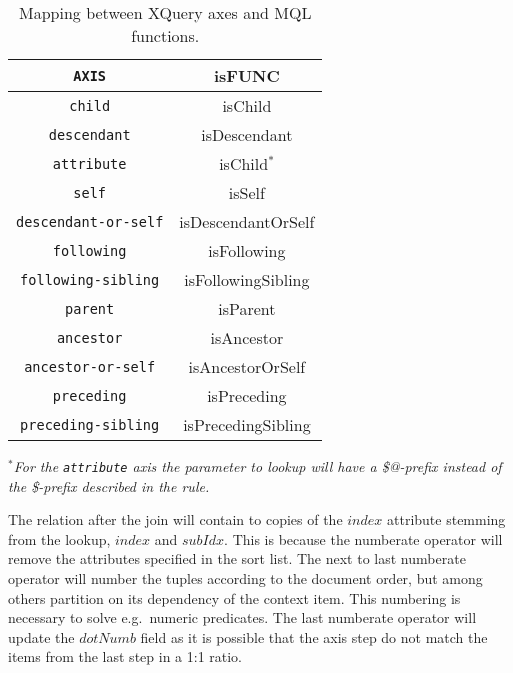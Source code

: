 \begin{table}[h]
\centering
\begin{tabular}{c|c}
\texttt{AXIS} & \textsf{isFUNC} \\ \hline
\texttt{child} & \textsf{isChild} \\
\texttt{descendant} & \textsf{isDescendant} \\
\texttt{attribute} & \textsf{isChild}$^{*}$ \\
\texttt{self} & \textsf{isSelf} \\
\texttt{descendant-or-self} & \textsf{isDescendantOrSelf} \\
\texttt{following} & \textsf{isFollowing} \\
\texttt{following-sibling} & \textsf{isFollowingSibling} \\
\texttt{parent} & \textsf{isParent} \\
\texttt{ancestor} & \textsf{isAncestor} \\
\texttt{ancestor-or-self} & \textsf{isAncestorOrSelf} \\
\texttt{preceding} & \textsf{isPreceding} \\
\texttt{preceding-sibling} & \textsf{isPrecedingSibling} 
\end{tabular}
\caption{Mapping between XQuery axes and MQL functions. \label{tab:trans:TD:axisMap}}
\end{table}

\textit{$^{*}$For the \texttt{attribute} axis the parameter to \textsf{lookup}
will have a \textsf{\$@}-prefix instead of the \textsf{\$}-prefix described in
the rule.}

The relation after the join will contain to copies of the $index$ attribute stemming from the lookup, $index$ and
$subIdx$. This is because the \textsf{numberate} operator will remove the attributes specified in the sort list.
The next to last \textsf{numberate} operator will number the tuples according to the document order, but among
others partition on its dependency of the context item. This numbering is necessary to solve e.g.\ numeric
predicates. The last \textsf{numberate} operator will update the $dotNumb$ field as it is possible that the axis
step do not match the items from the last step in a 1:1 ratio.

